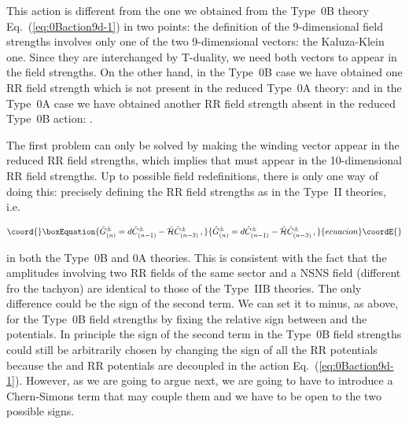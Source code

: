 \documentclass[12pt,a4paper]{article}
\begin{document}
This action is different from the one we obtained from the Type~0B
theory Eq.~(\ref{eq:0Baction9d-1}) in two points: the definition of
the 9-dimensional field strengths involves only one of the two
9-dimensional vectors: the Kaluza-Klein one. Since they are
interchanged by T-duality, we need both vectors to appear in the 
field strengths.
On the other hand, in the Type~0B case we have obtained one
RR field strength which is not present in the reduced Type~0A theory:
\coordHE{} and in the Type~0A case we have obtained another RR
field strength absent in the reduced Type~0B action: \coordHE{}.

The first problem can only be solved by making the winding vector
appear in the reduced RR field strengths, which implies that \coordHE{}
must appear in the 10-dimensional RR field strengths. Up to possible
field redefinitions, there is only one way of doing this: precisely
defining the RR field strengths as in the Type~II theories, i.e.

\begin{equation}\coord{}\boxEquation{
\label{eq:RRfieldstrengths}
\hat{G}^{\pm}_{(n)} = 
d\hat{C}^{\pm}_{(n-1)} -\hat{\cal H}\hat{C}^{\pm}_{(n-3)}\, ,
}{
\hat{G}^{\pm}_{(n)} = 
d\hat{C}^{\pm}_{(n-1)} -\hat{\cal H}\hat{C}^{\pm}_{(n-3)}\, ,
}{ecuacion}\coordE{}\end{equation}

\noindent in both the Type~0B and 0A theories. This is consistent 
with the fact that the amplitudes involving two RR fields of the same
sector and a NSNS field (different fro the tachyon) are identical to
those of the Type~IIB\myHighlight{$_{\pm}$}\coordHE{} theories. The only difference could be
the sign of the second term. We can set it to minus, as above, for the
Type~0B \coordHE{} field strengths by fixing the relative
sign between \coordHE{} and the \coordHE{} potentials.
In principle the sign of the second term in the Type~0B field
strengths \coordHE{} could still be arbitrarily chosen by
changing the sign of all the RR potentials \coordHE{} because
the \myHighlight{$+$}\coordHE{} and \myHighlight{$-$}\coordHE{} RR potentials are decoupled in the action
Eq.~(\ref{eq:0Baction9d-1}). However, as we are going to argue next,
we are going to have to introduce a Chern-Simons term that may couple
them and we have to be open to the two possible signs.
\end{document}
